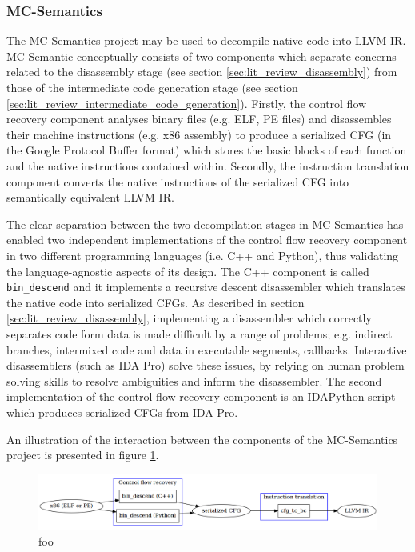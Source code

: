 
\subsubsection{MC-Semantics}
\label{sec:rel_work_mc-semantics}

The MC-Semantics project may be used to decompile native code into LLVM IR. MC-Semantic conceptually consists of two components which separate concerns related to the disassembly stage (see section \ref{sec:lit_review_disassembly}) from those of the intermediate code generation stage (see section \ref{sec:lit_review_intermediate_code_generation}). Firstly, the control flow recovery component analyses binary files (e.g. ELF, PE files) and disassembles their machine instructions (e.g. x86 assembly) to produce a serialized CFG (in the Google Protocol Buffer format) which stores the basic blocks of each function and the native instructions contained within. Secondly, the instruction translation component converts the native instructions of the serialized CFG into semantically equivalent LLVM IR.

The clear separation between the two decompilation stages in MC-Semantics has enabled two independent implementations of the control flow recovery component in two different programming languages (i.e. C++ and Python), thus validating the language-agnostic aspects of its design. The C++ component is called \texttt{bin\_descend} and it implements a recursive descent disassembler which translates the native code into serialized CFGs. As described in section \ref{sec:lit_review_disassembly}, implementing a disassembler which correctly separates code form data is made difficult by a range of problems; e.g. indirect branches, intermixed code and data in executable segments, callbacks. Interactive disassemblers (such as IDA Pro) solve these issues, by relying on human problem solving skills to resolve ambiguities and inform the disassembler. The second implementation of the control flow recovery component is an IDAPython script which produces serialized CFGs from IDA Pro.

An illustration of the interaction between the components of the MC-Semantics project is presented in figure \ref{fig:mcsema_overview}.

\begin{figure}[htbp]
	\includegraphics[width=\textwidth]{inc/3_rel_work/mcsema_overview.png}
	\caption{foo}
	\label{fig:mcsema_overview}
\end{figure}

